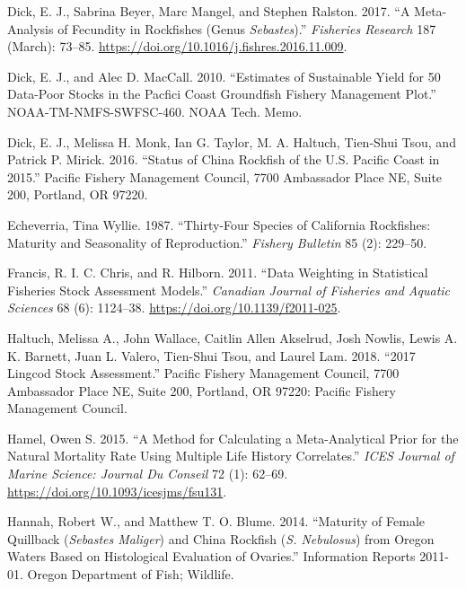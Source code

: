 \documentclass[11pt,
  english,
  a4paper,
]{article}
\begin{document}
\leavevmode\hypertarget{ref-dick_meta-analysis_2017}{}%
Dick, E. J., Sabrina Beyer, Marc Mangel, and Stephen Ralston. 2017. ``A Meta-Analysis of Fecundity in Rockfishes (Genus \emph{Sebastes}).'' \emph{Fisheries Research} 187 (March): 73--85. \url{https://doi.org/10.1016/j.fishres.2016.11.009}.

\leavevmode\hypertarget{ref-DickandMacCall_dbsra_2010}{}%
Dick, E. J., and Alec D. MacCall. 2010. ``Estimates of Sustainable Yield for 50 Data-Poor Stocks in the Pacfici Coast Groundfish Fishery Management Plot.'' NOAA-TM-NMFS-SWFSC-460. NOAA Tech. Memo.

\leavevmode\hypertarget{ref-dick_china_2016}{}%
Dick, E. J., Melissa H. Monk, Ian G. Taylor, M. A. Haltuch, Tien-Shui Tsou, and Patrick P. Mirick. 2016. ``Status of China Rockfish of the U.S. Pacific Coast in 2015.'' Pacific Fishery Management Council, 7700 Ambassador Place NE, Suite 200, Portland, OR 97220.

\leavevmode\hypertarget{ref-Echeverria_maturity_1987}{}%
Echeverria, Tina Wyllie. 1987. ``Thirty-Four Species of California Rockfishes: Maturity and Seasonality of Reproduction.'' \emph{Fishery Bulletin} 85 (2): 229--50.

\leavevmode\hypertarget{ref-francis_data_2011}{}%
Francis, R. I. C. Chris, and R. Hilborn. 2011. ``Data Weighting in Statistical Fisheries Stock Assessment Models.'' \emph{Canadian Journal of Fisheries and Aquatic Sciences} 68 (6): 1124--38. \url{https://doi.org/10.1139/f2011-025}.

\leavevmode\hypertarget{ref-haltuch_lingcod_2018}{}%
Haltuch, Melissa A., John Wallace, Caitlin Allen Akselrud, Josh Nowlis, Lewis A. K. Barnett, Juan L. Valero, Tien-Shui Tsou, and Laurel Lam. 2018. ``2017 Lingcod Stock Assessment.'' Pacific Fishery Management Council, 7700 Ambassador Place NE, Suite 200, Portland, OR 97220: Pacific Fishery Management Council.

\leavevmode\hypertarget{ref-hamel_method_2015}{}%
Hamel, Owen S. 2015. ``A Method for Calculating a Meta-Analytical Prior for the Natural Mortality Rate Using Multiple Life History Correlates.'' \emph{ICES Journal of Marine Science: Journal Du Conseil} 72 (1): 62--69. \url{https://doi.org/10.1093/icesjms/fsu131}.

\leavevmode\hypertarget{ref-HannahandBlume_maturity_2011}{}%
Hannah, Robert W., and Matthew T. O. Blume. 2014. ``Maturity of Female Quillback (\emph{Sebastes Maliger}) and China Rockfish (\emph{S. Nebulosus}) from Oregon Waters Based on Histological Evaluation of Ovaries.'' Information Reports 2011-01. Oregon Department of Fish; Wildlife.
\end{document}
